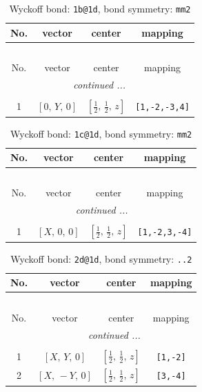 \documentclass[fleqn,8pt]{jsarticle}
\begin{document}
\begin{longtable}{cccc}
\caption{Wyckoff bond: {\tt 1b@1d}, bond symmetry: {\tt mm2}}
 \\
 \hline \hline
No. & vector & center & mapping \\ \hline \endfirsthead

\multicolumn{3}{l}{\tablename\ \thetable{}} \\
 \hline \hline
No. & vector & center & mapping \\ \hline \endhead

 \hline \hline
\multicolumn{3}{r}{\footnotesize\it continued ...} \\ \endfoot

 \hline \hline
\multicolumn{3}{r}{} \\ \endlastfoot

1 & $\left[ 0,\, Y,\, 0 \right]$ & $\left[ \frac{1}{2},\, \frac{1}{2},\, z \right]$ & {\tt [1,-2,-3,4]} \\
\end{longtable}
\renewcommand{\arraystretch}{1.2}
\begin{longtable}{cccc}
\caption{Wyckoff bond: {\tt 1c@1d}, bond symmetry: {\tt mm2}}
 \\
 \hline \hline
No. & vector & center & mapping \\ \hline \endfirsthead

\multicolumn{3}{l}{\tablename\ \thetable{}} \\
 \hline \hline
No. & vector & center & mapping \\ \hline \endhead

 \hline \hline
\multicolumn{3}{r}{\footnotesize\it continued ...} \\ \endfoot

 \hline \hline
\multicolumn{3}{r}{} \\ \endlastfoot

1 & $\left[ X,\, 0,\, 0 \right]$ & $\left[ \frac{1}{2},\, \frac{1}{2},\, z \right]$ & {\tt [1,-2,3,-4]} \\
\end{longtable}
\renewcommand{\arraystretch}{1.2}
\begin{longtable}{cccc}
\caption{Wyckoff bond: {\tt 2d@1d}, bond symmetry: {\tt ..2}}
 \\
 \hline \hline
No. & vector & center & mapping \\ \hline \endfirsthead

\multicolumn{3}{l}{\tablename\ \thetable{}} \\
 \hline \hline
No. & vector & center & mapping \\ \hline \endhead

 \hline \hline
\multicolumn{3}{r}{\footnotesize\it continued ...} \\ \endfoot

 \hline \hline
\multicolumn{3}{r}{} \\ \endlastfoot

1 & $\left[ X,\, Y,\, 0 \right]$ & $\left[ \frac{1}{2},\, \frac{1}{2},\, z \right]$ & {\tt [1,-2]} \\ \hline
2 & $\left[ X,\, - Y,\, 0 \right]$ & $\left[ \frac{1}{2},\, \frac{1}{2},\, z \right]$ & {\tt [3,-4]} \\
\end{longtable}
\end{document}
